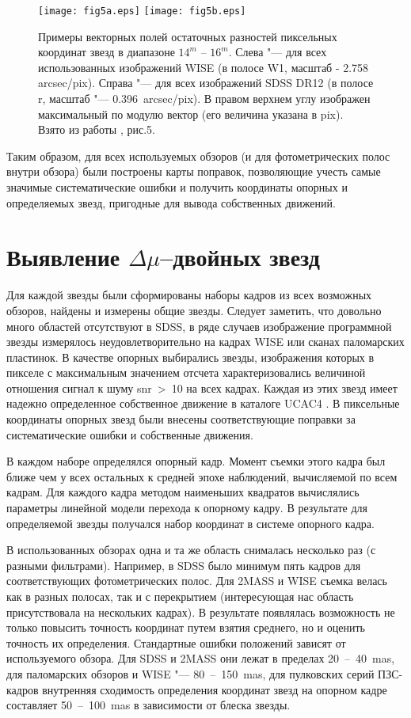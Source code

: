 \begin{figure}[h]
\centering
\texttt{[image: fig5a.eps]}
\texttt{[image: fig5b.eps]}
\caption{Примеры векторных полей остаточных разностей пиксельных координат звезд в диапазоне $14^m$ -- $16^m$. Слева "--- для всех использованных изображений WISE (в полосе W1, масштаб - 2.758 arcsec/pix). Справа "--- для всех изображений SDSS DR12 (в полосе r, масштаб "--- 0.396~arcsec/pix). В правом верхнем углу изображен максимальный по модулю вектор (его величина указана в pix). Взято из работы \cite{2015AstL...41..833K}, рис.5.}
\label{fig:15pixL}
\end{figure}

Таким образом, для всех используемых обзоров (и для фотометрических полос внутри обзора) были построены карты поправок, позволяющие учесть самые значимые систематические ошибки и получить координаты опорных и определяемых звезд, пригодные для вывода собственных движений.
\section{Выявление $\Delta\mu$--двойных звезд} \label{sec:ch3/sect3}
Для каждой звезды были сформированы наборы кадров из всех возможных обзоров, найдены и измерены общие звезды. Следует заметить, что довольно много областей отсутствуют в SDSS, в ряде случаев изображение программной звезды измерялось неудовлетворительно на кадрах WISE или сканах паломарских пластинок. В качестве опорных выбирались звезды, изображения которых в пикселе с максимальным значением отсчета характеризовались величиной отношения сигнал к шуму snr~>~10 на всех кадрах. Каждая из этих звезд имеет надежно определенное собственное движение в каталоге UCAC4 \cite{2013AJ....145...44Z}. В пиксельные координаты опорных звезд были внесены соответствующие поправки за систематические ошибки и собственные движения.

В каждом наборе определялся опорный кадр. Момент съемки этого кадра был ближе чем у всех остальных к средней эпохе наблюдений, вычисляемой по всем кадрам. Для каждого кадра методом наименьших квадратов вычислялись параметры линейной модели перехода к опорному кадру. В результате для определяемой звезды получался набор координат в системе опорного кадра.

В использованных обзорах одна и та же область снималась несколько раз (с разными фильтрами). Например, в SDSS было минимум пять кадров для соответствующих фотометрических полос. Для 2MASS и WISE съемка велась как в разных полосах, так и с перекрытием (интересующая нас область присутствовала на нескольких кадрах). В результате появлялась возможность не только повысить точность координат путем взятия среднего, но и оценить точность их определения. Стандартные ошибки положений зависят от используемого обзора. Для SDSS и 2MASS они лежат в пределах 20~--~40~mas, для паломарских обзоров и WISE "--- 80~--~150~mas, для пулковских серий ПЗС-кадров внутренняя сходимость определения координат звезд на опорном кадре составляет 50~--~100~mas в зависимости от блеска звезды.


